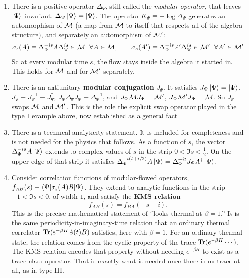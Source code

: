 \begin{enumerate}
\item There is a positive operator $\Delta_\Psi$, still called the \emph{modular operator}, that leaves
$\ket\Psi$ invariant: $\Delta_\Psi\ket\Psi=\ket\Psi$. The operator $K_\Psi\equiv-\log\Delta_\Psi$ generates an
automorphism of $\mathcal{M}$ (a map from $\mathcal{M}$ to itself that respects all of the algebra structure), and separately an
automorphism of $\mathcal{M}'$:
\begin{equation}
\sigma_s(A) \equiv \Delta_\Psi^{-is}A\Delta_\Psi^{is}\in\mathcal{M}\ \ \forall A\in\mathcal{M},
\qquad
\sigma_s(A') \equiv \Delta_\Psi^{-is}A'\Delta_\Psi^{is}\in\mathcal{M}'\ \ \forall A'\in\mathcal{M}' .
\label{eq:modflow-auto}
\end{equation}
So at every modular time $s$, the flow stays inside the algebra it started in. This holds for $\mathcal{M}$ and for
$\mathcal{M}'$ separately.
\item There is an antiunitary \textbf{modular conjugation} $J_\Psi$. It satisfies $J_\Psi\ket\Psi=\ket\Psi$,
$J_\Psi=J_\Psi^{-1}=J_\Psi^\dagger$, $J_\Psi\Delta_\Psi J_\Psi=\Delta_\Psi^{-1}$, and
$J_\Psi\mathcal{M} J_\Psi=\mathcal{M}'$, $J_\Psi\mathcal{M}'J_\Psi=\mathcal{M}$. So $J_\Psi$ swaps $\mathcal{M}$ and $\mathcal{M}'$. This is the role the explicit
swap operator played in the type I example above, now established as a general fact.
\item There is a technical analyticity statement. It is included for completeness and is not needed for the
physics that follows. As a function of $s$, the vector $\Delta_\Psi^{-is}A\ket\Psi$ extends to complex values
of $s$ in the strip $0<\Im s<\tfrac12$. On the upper edge of that strip it satisfies
$\Delta_\Psi^{-i(t+i/2)}A\ket\Psi=\Delta_\Psi^{-it}J_\Psi A^\dagger\ket\Psi$.
\item Consider correlation functions of modular-flowed operators, $f_{AB}(s)\equiv\braket{\Psi|\sigma_s(A)B|\Psi}$.
They extend to analytic functions in the strip $-1<\Im s<0$, of width $1$, and satisfy the \textbf{KMS
relation}
\begin{equation}
f_{AB}(s) = f_{BA}(-s-i) .
\label{eq:kms}
\end{equation}
This is the precise mathematical statement of ``looks thermal at $\beta=1$.'' It is the same
periodicity-in-imaginary-time relation that an ordinary thermal correlator $\operatorname{Tr}(e^{-\beta H}A(t)B)$ satisfies,
here with $\beta=1$. For an ordinary thermal state, the relation comes from the cyclic property of the trace
$\operatorname{Tr}(e^{-\beta H}\cdots)$. The KMS relation encodes that property without needing $e^{-\beta H}$ to exist as a
trace-class operator. That is exactly what is needed once there is no trace at all, as in type III.
\end{enumerate}

